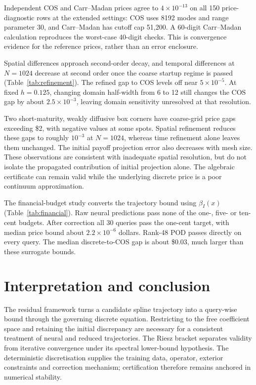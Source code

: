 \documentclass[11pt]{amsart}
\theoremstyle{remark}
\begin{document}
Independent COS and Carr--Madan prices agree to $4\times10^{-13}$ on all
150 price-diagnostic rows at the extended settings: COS uses 8192 modes
and range parameter 30, and Carr--Madan has cutoff cap 51,200. A 60-digit
Carr--Madan calculation reproduces the worst-case 40-digit checks.
This is convergence evidence for the reference prices, rather than an
error enclosure.


Spatial differences approach second-order decay, and temporal differences
at $N=1024$ decrease at second order once the coarse startup regime is
passed (Table~\ref{tab:refinement}). The refined gap to COS levels off near
$5\times10^{-5}$. At fixed $h=0.125$, changing domain half-width from 6 to
12 still changes the COS gap by about $2.5\times10^{-3}$, leaving domain
sensitivity unresolved at that resolution.


Two short-maturity, weakly diffusive box corners have coarse-grid price
gaps exceeding \$2, with negative values at some spots. Spatial refinement
reduces these gaps to roughly $10^{-3}$ at $N=1024$, whereas time refinement
alone leaves them unchanged. The initial payoff projection error also
 decreases with mesh size. These observations are consistent with inadequate
spatial resolution, but do not isolate the propagated contribution of
initial projection alone. The algebraic certificate can remain valid while
the underlying discrete price is a poor continuum approximation.


The financial-budget study converts the trajectory bound using
$\beta_I(x)$ (Table~\ref{tab:financial}). Raw neural predictions pass none
of the one-, five- or ten-cent budgets. After correction all 30 queries
pass the one-cent target, with median price bound about
$2.2\times10^{-6}$ dollars. Rank-48 POD passes directly on every query.
The median discrete-to-COS gap is about \$0.03, much larger than these
surrogate bounds.
\FloatBarrier
\section{Interpretation and conclusion}
\label{sec:conclusion}\label{sec:discussion}
The residual framework turns a candidate spline trajectory into a
query-wise bound through the governing discrete equation. Restricting to
the free coefficient space and retaining the initial discrepancy are
necessary for a consistent treatment of neural and reduced trajectories.
The Riesz bracket separates validity from iterative convergence under its
spectral lower-bound hypothesis. The deterministic discretisation supplies
the training data, operator, exterior constraints and correction mechanism;
certification therefore remains anchored in numerical stability.
\end{document}
